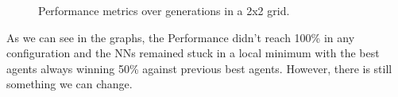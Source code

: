 \documentclass[11pt]{report}
\begin{document}
\begin{enumerate}
\begin{figure}[H]
\begin{adjustbox}{valign=c,margin=-2cm 0pt 0pt 0pt}
\begin{minipage}{1.1\textwidth}
\begin{subfigure}[b]{0.45\textwidth}
                \end{subfigure}


            \end{minipage}
        \end{adjustbox}
        \caption{Performance metrics over generations in a 2x2 grid.}
        \label{fig:performances-2}


    \end{figure}
    As we can see in the graphs, the Performance didn't reach 100\% in any configuration and the NNs remained stuck in a local minimum with the best agents always winning 50\% against previous best agents.
    However, there is still something we can change.

\end{enumerate}
\end{document}
